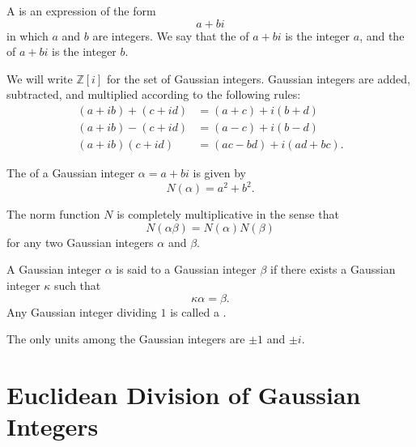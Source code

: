 \begin{definition}
  A  is an expression of the form
  \begin{equation*}
    a+bi
  \end{equation*}
  in which $a$ and $b$ are integers. We say that the  of $a+bi$ is the integer $a$, and the  of $a+bi$ is the integer $b$.

  We will write $\mathbb{Z}[i]$ for the set of Gaussian integers. Gaussian integers are added, subtracted, and multiplied according to the following rules:
  \begin{align*}
    (a+ib)+(c+id) & = (a+c)+i(b+d) \\
    (a+ib)-(c+id) & = (a-c)+i(b-d) \\
    (a+ib)(c+id)  & = (ac-bd)+i(ad+bc).
  \end{align*}
\end{definition}

\begin{definition}
  The  of a Gaussian integer $\alpha=a+bi$ is given by
  \begin{equation*}
    N(\alpha)=a^2+b^2.
  \end{equation*}
\end{definition}

\begin{proposition}
  The norm function $N$ is completely multiplicative in the sense that
  \begin{equation*}
    N(\alpha\beta)=N(\alpha)N(\beta)
  \end{equation*}
  for any two Gaussian integers $\alpha$ and $\beta$.
\end{proposition}

\begin{definition}
  A Gaussian integer $\alpha$ is said to  a Gaussian integer $\beta$ if there exists a Gaussian integer $\kappa$ such that
  \begin{equation*}
    \kappa\alpha=\beta.
  \end{equation*}
  Any Gaussian integer dividing $1$ is called a .
\end{definition}

\begin{theorem}
  The only units among the Gaussian integers are $\pm 1$ and $\pm i$.
\end{theorem}

\section{Euclidean Division of Gaussian Integers}

